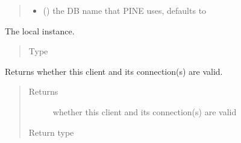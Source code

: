 \documentclass[letterpaper,10pt,english]{sphinxmanual}
\begin{document}
\begin{fulllineitems}
\begin{quote}
\begin{description}
\begin{itemize}
\item {} 
 (\sphinxstyleliteralemphasis{\sphinxupquote{, }}) \textendash{} the DB name that PINE uses, defaults to 

\end{itemize}

\end{description}\end{quote}

\begin{fulllineitems}
\label{\detokenize{autoapi/pine/client/index:pine.client.LocalPineClient.eve}}
The local  instance.
\begin{quote}\begin{description}
\item[{Type}] \leavevmode
{\hyperref[\detokenize{autoapi/pine/client/client/index:pine.client.client.EveClient}]{}}

\end{description}\end{quote}

\end{fulllineitems}


\begin{fulllineitems}
\label{\detokenize{autoapi/pine/client/index:pine.client.LocalPineClient.is_valid}}
Returns whether this client and its connection(s) are valid.
\begin{quote}\begin{description}
\item[{Returns}] \leavevmode
whether this client and its connection(s) are valid

\item[{Return type}] \leavevmode
{}

\end{description}\end{quote}

\end{fulllineitems}


\end{fulllineitems}
\end{document}
